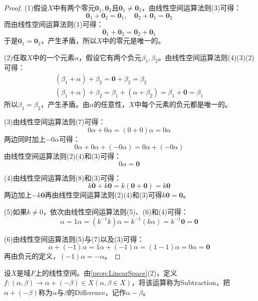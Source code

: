 \begin{proof}
	(1)假设$X$中有两个零元$\mathbf{0}_1,\mathbf{0}_2$且$\mathbf{0}_1\ne\mathbf{0}_2$，由线性空间运算法则(3)可得：
	\begin{equation*}
		\mathbf{0}_1+\mathbf{0}_2=\mathbf{0}_1,\quad\mathbf{0}_2+\mathbf{0}_1=\mathbf{0}_2
	\end{equation*}
	而由线性空间运算法则(1)可得：
	\begin{equation*}
		\mathbf{0}_1+\mathbf{0}_2=\mathbf{0}_2+\mathbf{0}_1
	\end{equation*}
	于是$\mathbf{0}_1=\mathbf{0}_2$，产生矛盾，所以$X$中的零元是唯一的。\par
	(2)任取$X$中的一个元素$\alpha$，假设它有两个负元$\beta_1,\beta_2$。由线性空间运算法则(4)(3)(2)可得：
	\begin{gather*}
		(\beta_1+\alpha)+\beta_2=\mathbf{0}+\beta_2=\beta_2 \\
		(\beta_1+\alpha)+\beta_2=\beta_1+(\alpha+\beta_2)=\beta_1+\mathbf{0}=\beta_1
	\end{gather*}
	所以$\beta_1=\beta_2$，产生矛盾。由$\alpha$的任意性，$X$中每个元素的负元都是唯一的。\par
	(3)由线性空间运算法则(7)可得：
	\begin{equation*}
		0\alpha+0\alpha=(0+0)\alpha=0\alpha
	\end{equation*}
	两边同时加上$-0\alpha$可得：
	\begin{equation*}
		0\alpha+0\alpha+(-0\alpha)=0\alpha+(-0\alpha)
	\end{equation*}
	由线性空间运算法则(2)(4)和(3)可得：
	\begin{equation*}
		0\alpha=\mathbf{0}
	\end{equation*}\par
	(4)由线性空间运算法则(8)和(3)可得：
	\begin{equation*}
		k\mathbf{0}+k\mathbf{0}=k(\mathbf{0}+\mathbf{0})=k\mathbf{0}
	\end{equation*}
	两边加上$-k\mathbf{0}$再由线性空间运算法则(2)(4)和(3)可得$k\mathbf{0}=\mathbf{0}$。\par
	(5)如果$k\ne0$，依次由线性空间运算法则(5)、(6)和(4)可得：
	\begin{equation*}
		\alpha=1\alpha=(k^{-1}k)\alpha=k^{-1}(k\alpha)=k^{-1}\mathbf{0}=\mathbf{0}
	\end{equation*}\par
	(6)由线性空间运算法则(5)与(7)以及(3)可得：
	\begin{equation*}
		\alpha+(-1)\alpha=1\alpha+(-1)\alpha=(1-1)\alpha=0\alpha=\mathbf{0}
	\end{equation*}
	再由负元的定义，$(-1)\alpha=-\alpha$。
\end{proof}
\begin{definition}
	设$X$是域$F$上的线性空间。由\cref{prop:LinearSpace}(2)，定义$f:(\alpha,\beta)\rightarrow\alpha+(-\beta)\in X(\alpha,\beta\in X)$，将该运算称为\gls{Subtraction}，把$\alpha+(-\beta)$称为$\alpha$与$\beta$的\gls{Difference}，记作$\alpha-\beta$。
\end{definition}

